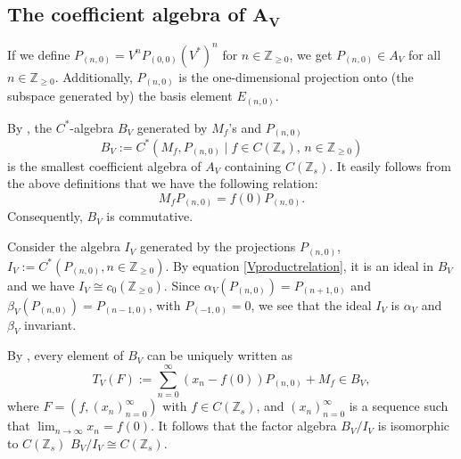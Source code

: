 \documentclass[pdftex]{sigma}
\newcommand{\Z}{{\mathbb Z}}
\numberwithin{equation}{section}
\begin{document}
\subsection[The coefficient algebra of A\_V]{The coefficient algebra of $\boldsymbol{A_V}$}
If we define
$
P_{(n,0)} = V^nP_{(0,0)}(V^*)^{n}$ for $n\in\Z_{\ge0}$,
we get $P_{(n,0)}\in A_V$ for all $n\in\Z_{\ge0}$. Additionally, $P_{(n,0)}$ is the one-dimensional projection onto (the subspace generated by) the basis element $E_{(n,0)}$.

By \cite[Proposition 5.2]{HKMP3}, the $C^*$-algebra $B_V$ generated by $M_f$'s and $P_{(n,0)}$
\begin{equation*}
B_V:=C^*(M_f,P_{(n,0)}\mid f\in C(\Z_s),\,n\in\Z_{\geq 0})
\end{equation*}
is the smallest coefficient algebra of $A_V$ containing $C(\Z_s)$.
 It easily follows from the above definitions that we have the following relation:
 \begin{equation}\label{Vproductrelation}
M_fP_{(n,0)}=f(0)P_{(n,0)} .
\end{equation}
Consequently, $B_V$ is commutative.

Consider the algebra $I_V$ generated by the projections $P_{(n,0)}$,
$I_V:= C^*(P_{(n,0)}, n\in\Z_{\geq 0})$.
By equation \eqref{Vproductrelation}, it is an ideal in $B_V$ and we have
$I_V\cong c_0(\Z_{\ge 0})$.
Since $\alpha_V(P_{(n,0)})=P_{(n+1,0)}$ and~${\beta_V(P_{(n,0)})=P_{(n-1,0)}}$, with $P_{(-1,0)}=0$, we see that the ideal $I_V$ is $\alpha_V$ and $\beta_V$ invariant.

 By \cite[Proposition 5.3]{HKMP3}, every element of $B_V$ can be uniquely written as
\begin{equation*}
 T_V(F):= \sum_{n=0}^{\infty}(x_n-f(0))P_{(n,0)}+M_{f} \in B_V,
\end{equation*}
where $F=(f, (x_n)_{n=0}^\infty)$ with $f\in C(\Z_s)$, and $(x_n)_{n=0}^\infty$ is a sequence such that $\lim_{n\to\infty}x_n=f(0)$. It follows that the factor algebra $B_V/I_V$ is isomorphic to $C(\Z_s)$
$
B_V/I_V\cong C(\Z_s)$.
\end{document}
